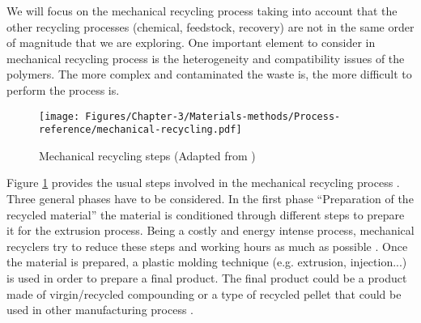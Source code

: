 We will focus on the mechanical recycling process taking into account that the other recycling processes (chemical, feedstock, recovery) are not in the same order of magnitude that we are exploring.
One important element to consider in mechanical recycling process is the heterogeneity and compatibility issues of the polymers.
The more complex and contaminated the waste is, the more difficult to perform the process is.
	
	\begin{figure}[H]
		\centering
		\texttt{[image: Figures/Chapter-3/Materials-methods/Process-reference/mechanical-recycling.pdf]}
		\caption{Mechanical recycling steps (Adapted from \parencite{Aznar2006, Al-Salem2009} ) }
		\label{Fig:Mechanical.recycling.steps}
	\end{figure}
	
		
Figure \ref{Fig:Mechanical.recycling.steps} provides  the usual steps involved in the mechanical recycling process \parencite{Aznar2006,Hopewell2009}.
Three general phases have to be considered.
In the first phase ``Preparation of the recycled material'' the material is conditioned through different steps to prepare it for the extrusion process. 
Being a costly and energy intense process, mechanical recyclers try to reduce these steps and working hours as much as possible \parencite{Al-Salem2009}. 
Once the material is prepared, a plastic molding technique (e.g. extrusion, injection...) is used in order to prepare a final product. The final product could be a product made of virgin/recycled compounding or a type of recycled pellet that could be used in other manufacturing process  \parencite{Briassoulis2013}. 

